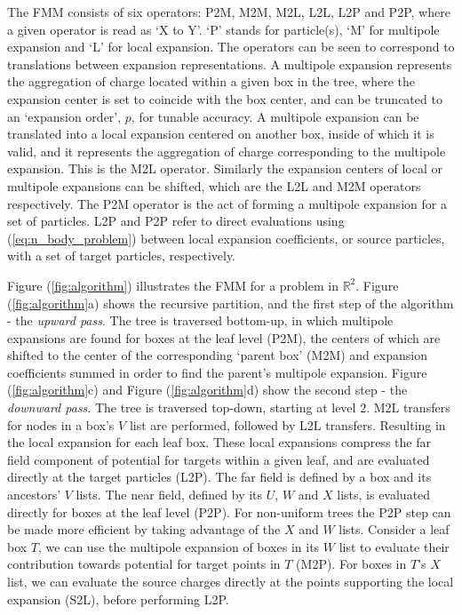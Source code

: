 \documentclass{IEEEcsmag}
\begin{document}
The FMM consists of six operators: P2M, M2M, M2L, L2L, L2P and P2P, where a given operator is read as `X to Y'. `P' stands for particle(s), `M' for multipole expansion and `L' for local expansion. The operators can be seen to correspond to translations between expansion representations. A multipole expansion represents the aggregation of charge located within a given box in the tree, where the expansion center is set to coincide with the box center, and can be truncated to an `expansion order', $p$, for tunable accuracy. A multipole expansion can be translated into a local expansion centered on another box, inside of which it is valid, and it represents the aggregation of charge corresponding to the multipole expansion. This is the M2L operator. Similarly the expansion centers of local or multipole expansions can be shifted, which are the L2L and M2M operators respectively. The P2M operator is the act of forming a multipole expansion for a set of particles. L2P and P2P refer to direct evaluations using (\ref{eq:n_body_problem}) between local expansion coefficients, or source particles, with a set of target particles, respectively.

Figure (\ref{fig:algorithm}) illustrates the FMM for a problem in $\mathbb{R}^2$. Figure (\ref{fig:algorithm}a) shows the recursive partition, and the first step of the algorithm - the \textit{upward pass}. The tree is traversed bottom-up, in which multipole expansions are found for boxes at the leaf level (P2M), the centers of which are shifted to the center of the corresponding `parent box' (M2M) and expansion coefficients summed in order to find the parent's multipole expansion. Figure (\ref{fig:algorithm}c) and Figure (\ref{fig:algorithm}d) show the second step - the \textit{downward pass}. The tree is traversed top-down, starting at level $2$. M2L transfers for nodes in a box's $V$ list are performed, followed by L2L transfers. Resulting in the local expansion for each leaf box. These local expansions compress the far field component of potential for targets within a given leaf, and are evaluated directly at the target particles (L2P). The far field is defined by a box and its ancestors' $V$ lists. The near field, defined by its $U$, $W$ and $X$ lists, is evaluated directly for boxes at the leaf level (P2P). For non-uniform trees the P2P step can be made more efficient by taking advantage of the $X$ and $W$ lists. Consider a leaf box $T$, we can use the multipole expansion of boxes in its $W$ list to evaluate their contribution towards potential for target points in $T$ (M2P). For boxes in $T$'s $X$ list, we can evaluate the source charges directly at the points supporting the local expansion (S2L), before performing L2P.
\end{document}
